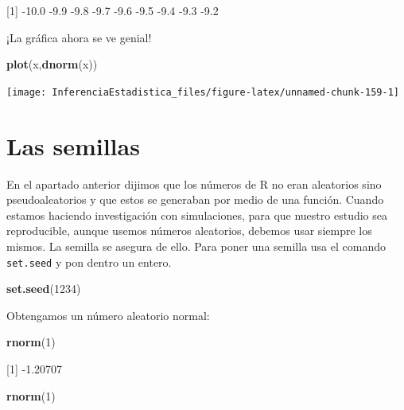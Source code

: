 \documentclass[
]{book}
\newenvironment{Shaded}{\begin{snugshade}}{\end{snugshade}}
\newcommand{\DecValTok}[1]{\textcolor[rgb]{0.00,0.00,0.81}{#1}}
\newcommand{\KeywordTok}[1]{\textcolor[rgb]{0.13,0.29,0.53}{\textbf{#1}}}
\newcommand{\NormalTok}[1]{#1}
\begin{document}
{[}1{]} -10.0 -9.9 -9.8 -9.7 -9.6 -9.5 -9.4 -9.3 -9.2

¡La gráfica ahora se ve genial!

\begin{Shaded}
\begin{Highlighting}[]
\KeywordTok{plot}\NormalTok{(x,}\KeywordTok{dnorm}\NormalTok{(x))}
\end{Highlighting}
\end{Shaded}

\begin{center}\texttt{[image: InferenciaEstadistica\_files/figure-latex/unnamed-chunk-159-1]} \end{center}

\hypertarget{las-semillas}{%
\section{Las semillas}\label{las-semillas}}

En el apartado anterior dijimos que los números de R no eran aleatorios sino pseudoaleatorios y que estos se generaban por medio de una función. Cuando estamos haciendo investigación con simulaciones, para que nuestro estudio sea reproducible, aunque usemos números aleatorios, debemos usar siempre los mismos. La semilla se asegura de ello. Para poner una semilla usa el comando \texttt{set.seed} y pon dentro un entero.

\begin{Shaded}
\begin{Highlighting}[]
\KeywordTok{set.seed}\NormalTok{(}\DecValTok{1234}\NormalTok{)}
\end{Highlighting}
\end{Shaded}

Obtengamos un número aleatorio normal:

\begin{Shaded}
\begin{Highlighting}[]
\KeywordTok{rnorm}\NormalTok{(}\DecValTok{1}\NormalTok{)}
\end{Highlighting}
\end{Shaded}

{[}1{]} -1.20707

\begin{Shaded}
\begin{Highlighting}[]
\KeywordTok{rnorm}\NormalTok{(}\DecValTok{1}\NormalTok{)}
\end{Highlighting}
\end{Shaded}
\end{document}
